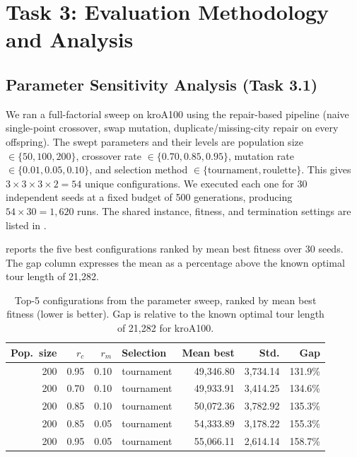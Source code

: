 \chapter{Task 3: Evaluation Methodology and Analysis}
\label{Task3}

\section{Parameter Sensitivity Analysis (Task 3.1)}
\label{T3:Sensitivity}

We ran a full-factorial sweep on kroA100 using the repair-based pipeline
(naive single-point crossover, swap mutation, duplicate/missing-city repair
on every offspring). The swept parameters and their levels are population
size $\in \{50, 100, 200\}$, crossover rate $\in \{0.70, 0.85, 0.95\}$,
mutation rate $\in \{0.01, 0.05, 0.10\}$, and selection method
$\in \{\text{tournament}, \text{roulette}\}$. This gives
$3 \times 3 \times 3 \times 2 = 54$ unique configurations. We executed
each one for 30 independent seeds at a fixed budget of 500 generations,
producing $54 \times 30 = 1{,}620$ runs. The shared instance, fitness, and
termination settings are listed in .

 reports the five best configurations ranked by mean
best fitness over 30 seeds. The gap column expresses the mean as a
percentage above the known optimal tour length of 21,282.

\begin{table}[htbp]
    \centering
    \caption{Top-5 configurations from the parameter sweep, ranked by mean best fitness (lower is better). Gap is relative to the known optimal tour length of 21,282 for kroA100.}
    \label{tab:sweep-top}
    \begin{tabular}{r r r l r r r}
        \hline
        Pop.\ size & $r_c$ & $r_m$ & Selection & Mean best & Std. & Gap \\
        \hline
        200 & 0.95 & 0.10 & tournament & 49{,}346.80 & 3{,}734.14 & 131.9\% \\
        200 & 0.70 & 0.10 & tournament & 49{,}933.91 & 3{,}414.25 & 134.6\% \\
        200 & 0.85 & 0.10 & tournament & 50{,}072.36 & 3{,}782.92 & 135.3\% \\
        200 & 0.85 & 0.05 & tournament & 54{,}333.89 & 3{,}178.22 & 155.3\% \\
        200 & 0.95 & 0.05 & tournament & 55{,}066.11 & 2{,}614.14 & 158.7\% \\
        \hline
    \end{tabular}
\end{table}

